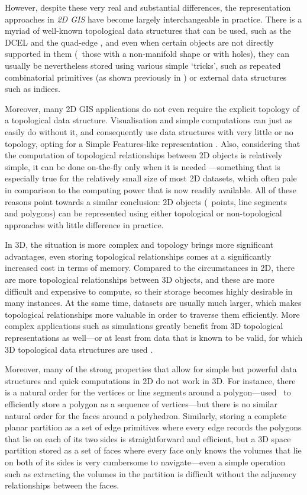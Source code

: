However, despite these very real and substantial differences, the representation approaches in \emph{2D GIS} have become largely interchangeable in practice.
There is a myriad of well-known topological data structures that can be used, such as the DCEL \citep{Muller78} and the quad-edge \citep{Guibas85}, and even when certain objects are not directly supported in them (\eg\ those with a non-manifold shape or with holes), they can usually be nevertheless stored using various simple `tricks', such as repeated combinatorial primitives (as shown previously in ) or external data structures such as indices.

Moreover, many 2D GIS applications do not even require the explicit topology of a topological data structure.
Visualisation and simple computations can just as easily do without it, and consequently use data structures with very little or no topology, opting for a Simple Features-like representation \citep{SimpleFeatures1}.
Also, considering that the computation of topological relationships between 2D objects is relatively simple, it can be done on-the-fly only when it is needed \citep{ESRITopology}---something that is especially true for the relatively small size of most 2D datasets, which often pale in comparison to the computing power that is now readily available.
All of these reasons point towards a similar conclusion: 2D objects (\ie\ points, line segments and polygons) can be represented using either topological or non-topological approaches with little difference in practice.

In 3D, the situation is more complex and topology brings more significant advantages, even storing topological relationships comes at a significantly increased cost in terms of memory.
Compared to the circumstances in 2D, there are more topological relationships between 3D objects, and these are more difficult and expensive to compute, so their storage becomes highly desirable in many instances.
At the same time, datasets are usually much larger, which makes topological relationships more valuable in order to traverse them efficiently.
More complex applications such as simulations greatly benefit from 3D topological representations as well---or at least from data that is known to be valid, for which 3D topological data structures are used \citep{Ledoux13}.

Moreover, many of the strong properties that allow for simple but powerful data structures and quick computations in 2D do not work in 3D.
For instance, there is a natural order for the vertices or line segments around a polygon---used \eg\ to efficiently store a polygon as a sequence of vertices---but there is no similar natural order for the faces around a polyhedron.
Similarly, storing a complete planar partition as a set of edge primitives where every edge records the polygons that lie on each of its two sides \citep{Peucker75} is straightforward and efficient, but a 3D space partition stored as a set of faces where every face only knows the volumes that lie on both of its sides is very cumbersome to navigate---even a simple operation such as extracting the volumes in the partition is difficult without the adjacency relationships between the faces.

